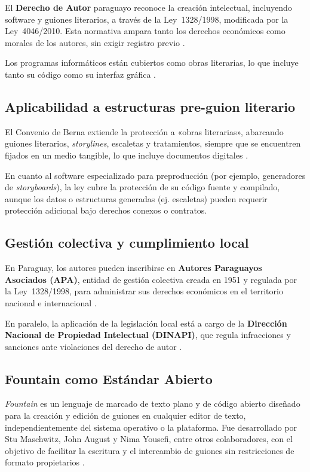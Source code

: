 \documentclass[12pt]{article}
\begin{document}
	{\sloppy
		El \textbf{Derecho de Autor} paraguayo reconoce la creación intelectual, incluyendo software y guiones literarios, a través de la Ley 1328/1998, modificada por la Ley 4046/2010. Esta normativa ampara tanto los derechos económicos como morales de los autores, sin exigir registro previo \parencite{wipo_paraguay}.
	}

	Los programas informáticos están cubiertos como obras literarias, lo que incluye tanto su código como su interfaz gráfica \parencite{njq_paraguay,paraguay_software1998}.

	\subsection{Aplicabilidad a estructuras pre-guion literario}

	El Convenio de Berna extiende la protección a «obras literarias», abarcando guiones literarios, \textit{storylines}, escaletas y tratamientos, siempre que se encuentren fijados en un medio tangible, lo que incluye documentos digitales \parencite{berne2025}.

	En cuanto al software especializado para preproducción (por ejemplo, generadores de \textit{storyboards}), la ley cubre la protección de su código fuente y compilado, aunque los datos o estructuras generadas (ej. escaletas) pueden requerir protección adicional bajo derechos conexos o contratos.

	\subsection{Gestión colectiva y cumplimiento local}

	En Paraguay, los autores pueden inscribirse en \textbf{Autores Paraguayos Asociados (APA)}, entidad de gestión colectiva creada en 1951 y regulada por la Ley 1328/1998, para administrar sus derechos económicos en el territorio nacional e internacional \parencite{apa_py}.

	En paralelo, la aplicación de la legislación local está a cargo de la \textbf{Dirección Nacional de Propiedad Intelectual (DINAPI)}, que regula infracciones y sanciones ante violaciones del derecho de autor \parencite{ip_office_py}.

	\subsection{Fountain como Estándar Abierto}

	\textit{Fountain} es un lenguaje de marcado de texto plano y de código abierto diseñado para la creación y edición de guiones en cualquier editor de texto, independientemente del sistema operativo o la plataforma. Fue desarrollado por Stu Maschwitz, John August y Nima Yousefi, entre otros colaboradores, con el objetivo de facilitar la escritura y el intercambio de guiones sin restricciones de formato propietarios \parencite{fountain_wikipedia, fountain_official}.
\end{document}
